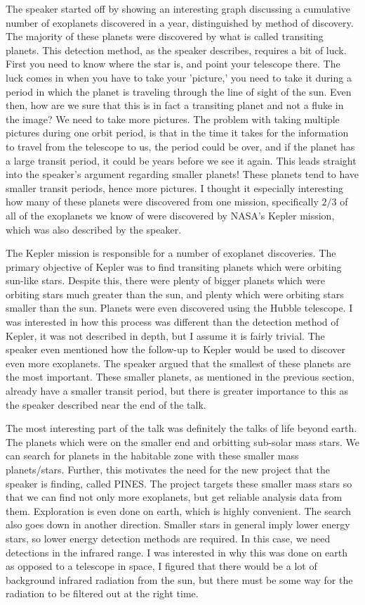 \documentclass[12pt]{article}
\begin{document}
The speaker started off by showing an interesting graph discussing a cumulative number of exoplanets discovered in a year, distinguished by method of discovery. The majority of these planets were discovered by what is called transiting planets. This detection method, as the speaker describes, requires a bit of luck. First you need to know where the star is, and point your telescope there. The luck comes in when you have to take your 'picture,' you need to take it during a period in which the planet is traveling through the line of sight of the sun. Even then, how are we sure that this is in fact a transiting planet and not a fluke in the image? We need to take more pictures. The problem with taking multiple pictures during one orbit period, is that in the time it takes for the information to travel from the telescope to us, the period could be over, and if the planet has a large transit period, it could be years before we see it again. This leads straight into the speaker's argument regarding smaller planets! These planets tend to have smaller transit periods, hence more pictures. I thought it especially interesting how many of these planets were discovered from one mission, specifically $2/3$ of all of the exoplanets we know of were discovered by NASA's Kepler mission, which was also described by the speaker.

The Kepler mission is responsible for a number of exoplanet discoveries. The primary objective of Kepler was to find transiting planets which were orbiting sun-like stars. Despite this, there were plenty of bigger planets which were orbiting stars much greater than the sun, and plenty which were orbiting stars smaller than the sun. Planets were even discovered using the Hubble telescope. I was interested in how this process was different than the detection method of Kepler, it was not described in depth, but I assume it is fairly trivial. The speaker even mentioned how the follow-up to Kepler would be used to discover even more exoplanets. The speaker argued that the smallest of these planets are the most important. These smaller planets, as mentioned in the previous section, already have a smaller transit period, but there is greater importance to this as the speaker described near the end of the talk.

The most interesting part of the talk was definitely the talks of life beyond earth. The planets which were on the smaller end and orbitting sub-solar mass stars. We can search for planets in the habitable zone with these smaller mass planets/stars. Further, this motivates the need for the new project that the speaker is finding, called PINES. The project targets these smaller mass stars so that we can find not only more exoplanets, but get reliable analysis data from them. Exploration is even done on earth, which is highly convenient. The search also goes down in another direction. Smaller stars in general imply lower energy stars, so lower energy detection methods are required. In this case, we need detections in the infrared range. I was interested in why this was done on earth as opposed to a telescope in space, I figured that there would be a lot of background infrared radiation from the sun, but there must be some way for the radiation to be filtered out at the right time.
\end{document}
